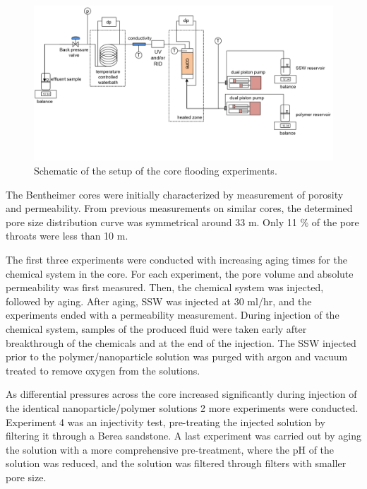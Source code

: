 \documentclass[nanomaterials,article,submit,moreauthors,pdftex]{Definitions/mdpi}
\begin{document}
\begin{figure}[h!]
        \includegraphics[width=\textwidth]{fig/experimentalSetup.png}
        \caption{Schematic of the setup of the core flooding experiments.}
        \label{fig:experimentalSetup}
\end{figure}

The Bentheimer cores were initially characterized by measurement of porosity and permeability. From previous measurements on similar cores, the determined pore size distribution curve was symmetrical around 33 \micro m. Only 11 \% of the pore throats were less than 10 \micro m.


The first three experiments were conducted with increasing aging times for the chemical system in the core. For each experiment, the pore volume and absolute permeability was first measured. Then, the chemical system was injected, followed by aging. After aging, SSW was injected at 30 ml/hr, and the experiments ended with a permeability measurement. During injection of the chemical system, samples of the produced fluid were taken early after breakthrough of the chemicals and at the end of the injection. The SSW injected prior to the polymer/nanoparticle solution was purged with argon and vacuum treated to remove oxygen from the solutions.

As differential pressures across the core increased significantly during injection of the identical nanoparticle/polymer solutions 2 more experiments were conducted. Experiment 4 was an injectivity test, pre-treating the injected solution by filtering it through a Berea sandstone. A last experiment was carried out by aging the solution with a more comprehensive pre-treatment, where the pH of the solution was reduced, and the solution was filtered through filters with smaller pore size.
\end{document}

